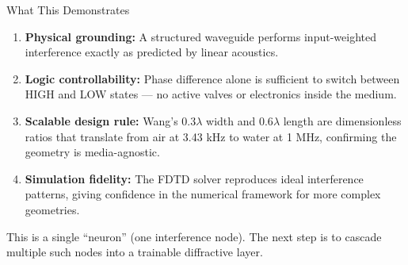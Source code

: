 \documentclass[aspectratio=169,11pt]{beamer}
\begin{document}
\begin{frame}{What This Demonstrates}
  \begin{enumerate}
    \item \textbf{Physical grounding:} A structured waveguide performs input-weighted interference exactly as predicted by linear acoustics.
    \item \textbf{Logic controllability:} Phase difference alone is sufficient to switch between HIGH and LOW states — no active valves or electronics inside the medium.
    \item \textbf{Scalable design rule:} Wang's $0.3\lambda$ width and $0.6\lambda$ length are dimensionless ratios that translate from air at 3.43 kHz to water at 1 MHz, confirming the geometry is media-agnostic.
    \item \textbf{Simulation fidelity:} The FDTD solver reproduces ideal interference patterns, giving confidence in the numerical framework for more complex geometries.
  \end{enumerate}

  \vspace{0.25cm}
  \textcolor{gdpDarkBlue}{\small This is a single ``neuron'' (one interference node). The next step is to cascade multiple such nodes into a trainable diffractive layer.}
\end{frame}
\end{document}
